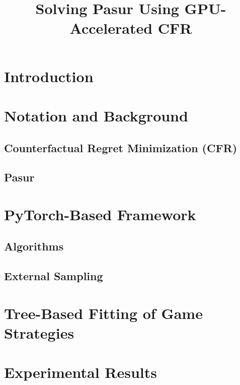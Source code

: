 \documentclass{article}
\title{Solving Pasur Using GPU-Accelerated CFR}
\begin{document}
\maketitle
\tableofcontents
\section{Introduction}
\section{Notation and Background}

\subsection{Counterfactual Regret Minimization (CFR)}

\subsection{Pasur}

\section{PyTorch-Based Framework}

% 



\subsection{Algorithms}


\newpage
\subsection{External Sampling}

\section{Tree-Based Fitting of Game Strategies}\label{sec:tree}
\section{ Experimental Results}\label{sec:Experimental}

 
\end{document}
